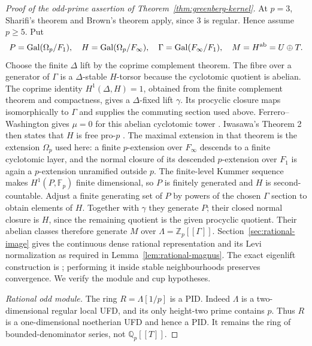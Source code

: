 \documentclass[11pt]{article}
\theoremstyle{definition}
\numberwithin{equation}{section}
\begin{document}
\begin{proof}[Proof of the odd-prime assertion of Theorem~\ref{thm:greenberg-kernel}]
At $p=3$, Sharifi's theorem \cite[Theorem~1, p.~2]{Sharifi2002} and Brown's theorem apply, since $3$ is
regular. Hence
assume $p\ge5$. Put
\begin{equation}
 P=\operatorname{Gal}(\Omega_p/F_1),\quad
 H=\operatorname{Gal}(\Omega_p/F_\infty),\quad
 \Gamma=\operatorname{Gal}(F_\infty/F_1),\quad
 M=H^{\rm ab}=U\oplus T.
\end{equation}
Choose the finite $\Delta$ lift by the coprime complement theorem.
The fibre over a generator of $\Gamma$ is a $\Delta$-stable
$H$-torsor because the cyclotomic quotient is abelian.
The coprime identity $H^1(\Delta,H)=1$, obtained from the finite
complement theorem and compactness, gives a $\Delta$-fixed lift
$\gamma$. Its procyclic closure maps isomorphically to $\Gamma$
and supplies the commuting section used above.
Ferrero--Washington gives $\mu=0$ for this abelian cyclotomic tower
\cite{FerreroWashington1979}. Iwasawa's Theorem 2 then states that
$H$ is free pro-$p$ \cite[p.~273]{Iwasawa1981}.
The maximal extension in that theorem is the extension $\Omega_p$
used here: a finite $p$-extension over $F_\infty$ descends to a finite
cyclotomic layer, and the normal closure of its descended
$p$-extension over $F_1$ is again a $p$-extension unramified outside
$p$.
The finite-level Kummer sequence makes $H^1(P,\mathbb F_p)$
finite dimensional, so $P$ is finitely generated and $H$ is
second-countable. Adjust a finite generating set of $P$ by powers
of the chosen $\Gamma$ section to obtain elements of $H$.
Together with $\gamma$ they generate $P$; their closed normal
closure is $H$, since the remaining quotient is the given
procyclic quotient. Their abelian classes therefore generate $M$
over $\Lambda=\mathbb Z_p[[\Gamma]]$.
Section~\ref{sec:rational-image} gives the continuous dense rational
representation and its Levi normalization as required in
Lemma~\ref{lem:rational-magnus}. The exact eigenlift construction
is \cite[Lemma~4, p.~3]{Sharifi2002}; performing it inside
stable neighbourhoods preserves convergence. We verify the module and cup hypotheses.

\emph{Rational odd module.}
The ring $R=\Lambda[1/p]$ is a PID. Indeed $\Lambda$ is a
two-dimensional regular local UFD, and its only height-two prime
contains $p$. Thus $R$ is a one-dimensional noetherian UFD and
hence a PID. It remains the ring of bounded-denominator series,
not $\mathbb Q_p[[T]]$.


\end{proof}
\end{document}
